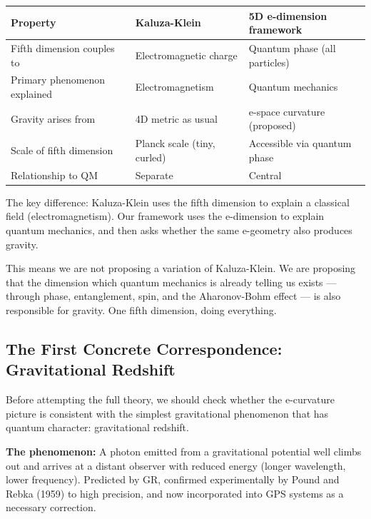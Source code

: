 \documentclass[aps,prd,preprint,superscriptaddress,longbibliography,floatfix]{revtex4-2}
\theoremstyle{remark}
\begin{document}
\begin{table}[H]
\begin{ruledtabular}
\begin{tabular}{p{5.0cm}p{5.0cm}p{5.0cm}}
Property & Kaluza-Klein & 5D e-dimension framework \\
\hline
Fifth dimension couples to & Electromagnetic charge & Quantum phase (all particles) \\
Primary phenomenon explained & Electromagnetism & Quantum mechanics \\
Gravity arises from & 4D metric as usual & e-space curvature (proposed) \\
Scale of fifth dimension & Planck scale (tiny, curled) & Accessible via quantum phase \\
Relationship to QM & Separate & Central \\
\end{tabular}
\end{ruledtabular}
\end{table}

The key difference: Kaluza-Klein uses the fifth dimension to explain a classical field (electromagnetism). Our framework uses the e-dimension to explain quantum mechanics, and then asks whether the same e-geometry also produces gravity.

This means we are not proposing a variation of Kaluza-Klein. We are proposing that the dimension which quantum mechanics is already telling us exists --- through phase, entanglement, spin, and the Aharonov-Bohm effect --- is also responsible for gravity. One fifth dimension, doing everything.



\subsection{The First Concrete Correspondence: Gravitational Redshift}

Before attempting the full theory, we should check whether the e-curvature picture is consistent with the simplest gravitational phenomenon that has quantum character: gravitational redshift.

\textbf{The phenomenon:} A photon emitted from a gravitational potential well climbs out and arrives at a distant observer with reduced energy (longer wavelength, lower frequency). Predicted by GR, confirmed experimentally by Pound and Rebka (1959) to high precision, and now incorporated into GPS systems as a necessary correction.
\end{document}
